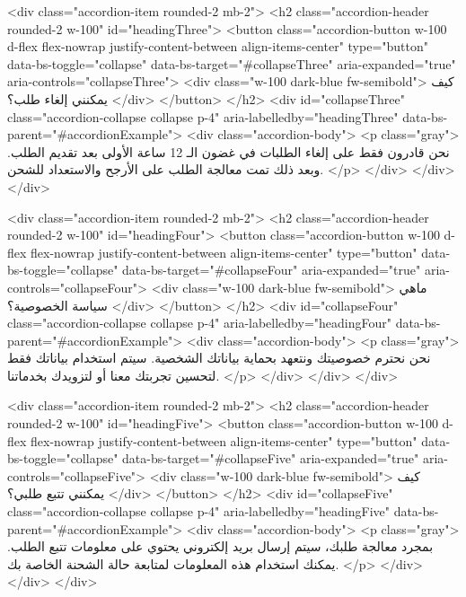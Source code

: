             <div class="accordion-item rounded-2 mb-2">
              <h2 class="accordion-header rounded-2 w-100" id="headingThree">
                <button class="accordion-button w-100 d-flex flex-nowrap justify-content-between align-items-center"
                  type="button" data-bs-toggle="collapse" data-bs-target="#collapseThree" aria-expanded="true"
                  aria-controls="collapseThree">
                  <div class="w-100 dark-blue fw-semibold">
                    كيف يمكنني إلغاء طلب؟
                  </div>
                </button>
              </h2>
              <div id="collapseThree" class="accordion-collapse collapse p-4" aria-labelledby="headingThree"
                data-bs-parent="#accordionExample">
                <div class="accordion-body">
                  <p class="gray">
                    نحن قادرون فقط على إلغاء الطلبات في غضون الـ 12 ساعة الأولى
                    بعد تقديم الطلب. وبعد ذلك تمت معالجة الطلب على الأرجح
                    والاستعداد للشحن.
                  </p>
                </div>
              </div>
            </div>

            <div class="accordion-item rounded-2 mb-2">
              <h2 class="accordion-header rounded-2 w-100" id="headingFour">
                <button class="accordion-button w-100 d-flex flex-nowrap justify-content-between align-items-center"
                  type="button" data-bs-toggle="collapse" data-bs-target="#collapseFour" aria-expanded="true"
                  aria-controls="collapseFour">
                  <div class="w-100 dark-blue fw-semibold">
                    ماهي سياسة الخصوصية؟
                  </div>
                </button>
              </h2>
              <div id="collapseFour" class="accordion-collapse collapse p-4" aria-labelledby="headingFour"
                data-bs-parent="#accordionExample">
                <div class="accordion-body">
                  <p class="gray">
                    نحن نحترم خصوصيتك ونتعهد بحماية بياناتك الشخصية. سيتم
                    استخدام بياناتك فقط لتحسين تجربتك معنا أو لتزويدك بخدماتنا.
                  </p>
                </div>
              </div>
            </div>

            <div class="accordion-item rounded-2 mb-2">
              <h2 class="accordion-header rounded-2 w-100" id="headingFive">
                <button class="accordion-button w-100 d-flex flex-nowrap justify-content-between align-items-center"
                  type="button" data-bs-toggle="collapse" data-bs-target="#collapseFive" aria-expanded="true"
                  aria-controls="collapseFive">
                  <div class="w-100 dark-blue fw-semibold">
                    كيف يمكنني تتبع طلبي؟
                  </div>
                </button>
              </h2>
              <div id="collapseFive" class="accordion-collapse collapse p-4" aria-labelledby="headingFive"
                data-bs-parent="#accordionExample">
                <div class="accordion-body">
                  <p class="gray">
                    بمجرد معالجة طلبك، سيتم إرسال بريد إلكتروني يحتوي على
                    معلومات تتبع الطلب. يمكنك استخدام هذه المعلومات لمتابعة حالة
                    الشحنة الخاصة بك.
                  </p>
                </div>
              </div>
            </div>

